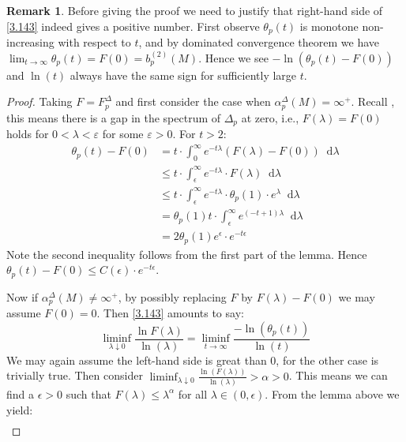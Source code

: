 \documentclass[11pt]{report}
\theoremstyle{definition}
\newtheorem{Rmk}{Remark}[chapter]
\theoremstyle{plain}
\newcommand{\mass}[1]{\mathop{}\mathrm{d}{#1}}
\begin{document}
\begin{Rmk}
	Before giving the proof we need to justify that right-hand side of \ref{3.143} indeed gives a positive number. First observe $\theta_p(t)$ is monotone non-increasing with respect to $t$, and by dominated convergence theorem we have $\lim_{t\to \infty}\theta_p(t)=F(0)=b^{(2)}_p(M)$. Hence we see $-\ln(\theta_p(t)-F(0))$ and $\ln(t)$ always have the same sign for sufficiently large $t$.
\end{Rmk}
\begin{proof}
	Taking $F=F^\Delta_p$ and first consider the case when $\alpha^\Delta_p(M)=\infty^+$. Recall , this means there is a gap in the spectrum of $\Delta_p$ at zero, i.e., $F(\lambda)=F(0)$ holds for $0<\lambda<\varepsilon$ for some $\varepsilon>0$. For $t> 2$:
	\begin{equation}
	\begin{split}
	\theta_p(t)-F(0)&=t\cdot \int_{0}^{\infty}e^{-t\lambda}(F(\lambda)-F(0))\mass{\lambda}\\
	&\leq t\cdot \int_{\epsilon}^{\infty}e^{-t\lambda}\cdot F(\lambda)\mass{\lambda}\\
	&\leq t\cdot \int_{\epsilon}^{\infty}e^{-t\lambda}\cdot \theta_p(1)\cdot e^\lambda\mass{\lambda}\\
	&=\theta_p(1)t\cdot \int_{\epsilon}^{\infty}e^{(-t+1)\lambda}\mass{\lambda}\\
	&=2\theta_p(1)e^\epsilon\cdot e^{-t\epsilon}
	\end{split}
	\end{equation}
	Note the second inequality follows from the first part of the lemma. Hence $\theta_p(t)-F(0)\leq C(\epsilon)\cdot e^{-t\epsilon}$.
	\par Now if $\alpha^\Delta_p(M)\neq \infty^+$, by possibly replacing $F$ by $F(\lambda)-F(0)$ we may assume $F(0)=0$. Then \ref{3.143} amounts to say:
	\begin{equation}
	\liminf_{\lambda\downarrow 0}\frac{\ln F(\lambda)}{\ln(\lambda)}= \liminf_{t\to \infty}\frac{-\ln(\theta_p(t))}{\ln(t)}
	\end{equation}
	We may again assume the left-hand side is great than 0, for the other case is trivially true. Then consider $\liminf_{\lambda\downarrow 0}\frac{\ln(F(\lambda))}{\ln(\lambda)}>\alpha>0$. This means we can find a $\epsilon>0$ such that $F(\lambda)\leq \lambda^\alpha$ for all $\lambda\in (0, \epsilon)$. From the lemma above we yield:
	\begin{equation*}
	\begin{split}

\end{split}
\end{equation*}
\end{proof}
\end{document}
